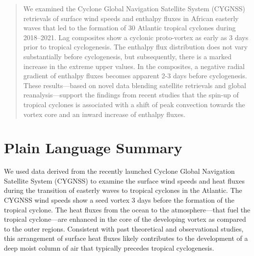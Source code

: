 \documentclass[draft]{agujournal2019}
\begin{document}

\begin{abstract}
We examined the Cyclone Global Navigation Satellite System (CYGNSS) retrievals of surface wind speeds and enthalpy fluxes in African easterly waves that led to the formation of 30 Atlantic tropical cyclones during 2018--2021. Lag composites show a cyclonic proto-vortex as early as 3 days prior to tropical cyclogenesis. The enthalpy flux distribution does not vary substantially before cyclogenesis, but subsequently, there is a marked increase in the extreme upper values. In the composites, a negative radial gradient of enthalpy fluxes becomes apparent 2-3 days before cyclogenesis. These results---based on novel data blending satellite retrievals and global reanalysis---support the findings from recent studies that the spin-up of tropical cyclones is associated with a shift of peak convection towards the vortex core and an inward increase of enthalpy fluxes. 
\end{abstract}


\section*{Plain Language Summary}
We used data derived from the recently launched Cyclone Global Navigation Satellite System (CYGNSS) to examine the surface wind speeds and heat fluxes during the transition of easterly waves to tropical cyclones in the Atlantic. The CYGNSS wind speeds show a seed vortex 3 days before the formation of the tropical cyclone. The heat fluxes from the ocean to the atmosphere---that fuel the tropical cyclone---are enhanced in the core of the developing vortex as compared to the outer regions. Consistent with past theoretical and observational studies, this arrangement of surface heat fluxes likely contributes to the development of a deep moist column of air that typically precedes tropical cyclogenesis. 

%
%
\end{document}
